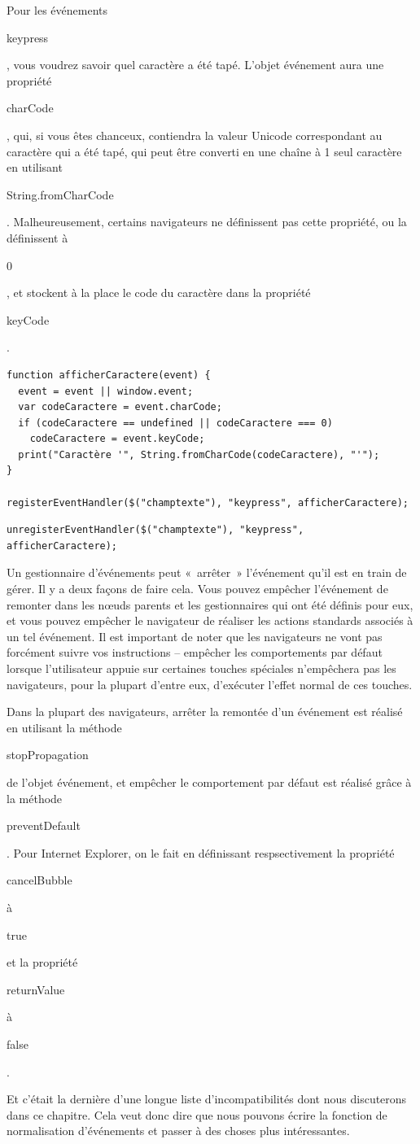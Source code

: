 \documentclass{FramateX}
\renewcommand{\texttt}[1]{\begin{sffamily}{#1}\end{sffamily}}
\begin{document}
Pour les événements \texttt{keypress}, vous voudrez savoir quel
caractère a été tapé. L'objet événement aura une propriété
\texttt{charCode}, qui, si vous êtes chanceux, contiendra la valeur
Unicode correspondant au caractère qui a été tapé, qui peut être
converti en une chaîne à 1 seul caractère en utilisant
\texttt{String.fromCharCode}. Malheureusement, certains navigateurs ne
définissent pas cette propriété, ou la définissent à \texttt{0}, et
stockent à la place le code du caractère dans la propriété
\texttt{keyCode}.

\begin{lstlisting}
function afficherCaractere(event) {
  event = event || window.event;
  var codeCaractere = event.charCode;
  if (codeCaractere == undefined || codeCaractere === 0)
    codeCaractere = event.keyCode;
  print("Caractère '", String.fromCharCode(codeCaractere), "'");
}

registerEventHandler($("champtexte"), "keypress", afficherCaractere);
\end{lstlisting}
\begin{lstlisting}
unregisterEventHandler($("champtexte"), "keypress", afficherCaractere);
\end{lstlisting}
\begin{center}\end{center}

Un gestionnaire d'événements peut «~arrêter~» l'événement qu'il est en
train de gérer. Il y a deux façons de faire cela. Vous pouvez empêcher
l'événement de remonter dans les nœuds parents et les gestionnaires qui
ont été définis pour eux, et vous pouvez empêcher le navigateur de
réaliser les actions standards associés à un tel événement. Il est
important de noter que les navigateurs ne vont pas forcément suivre vos
instructions -- empêcher les comportements par défaut lorsque
l'utilisateur appuie sur certaines touches spéciales n'empêchera pas les
navigateurs, pour la plupart d'entre eux, d'exécuter l'effet normal de
ces touches.

Dans la plupart des navigateurs, arrêter la remontée d'un événement est
réalisé en utilisant la méthode \texttt{stopPropagation} de l'objet
événement, et empêcher le comportement par défaut est réalisé grâce à la
méthode \texttt{preventDefault}. Pour Internet Explorer, on le fait en
définissant respsectivement la propriété \texttt{cancelBubble} à
\texttt{true} et la propriété \texttt{returnValue} à \texttt{false}.

Et c'était la dernière d'une longue liste d'incompatibilités dont nous
discuterons dans ce chapitre. Cela veut donc dire que nous pouvons
écrire la fonction de normalisation d'événements et passer à des choses
plus intéressantes.
\end{document}
